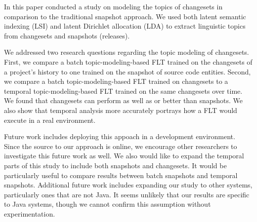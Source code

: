 
In this paper conducted a study on modeling the topics of changesets in comparison to the traditional snapshot approach.
We used both latent semantic indexing (LSI) and latent Dirichlet
allocation (LDA) to extract linguistic topics from changesets and
snapshots (releases).

We addressed two research questions regarding the topic modeling of changesets.
First, we compare a batch topic-modeling-based FLT trained on the changesets
of a project's history to one trained on the snapshot of source code entities.
Second, we compare a batch topic-modeling-based FLT trained on changesets
to a temporal topic-modeling-based FLT trained on the same changesets over time.
We found that changesets can perform as well as or better than snapshots.
We also show that temporal analysis more accurately portrays how a FLT would execute in a real environment.


Future work includes deploying this appoach in a development environment.
Since the source to our approach is online, we encourage other researchers
to investigate this future work as well.
We also would like to expand the temporal parts of this study to include
both snapshots and changesets.
It would be particularly useful to compare results between batch snapshots and temporal snapshots.
Additional future work includes expanding our study to other systems,
particularly ones that are not Java.
It seems unlikely that our results are specific to Java systems,
though we cannot confirm this assumption without experimentation.


